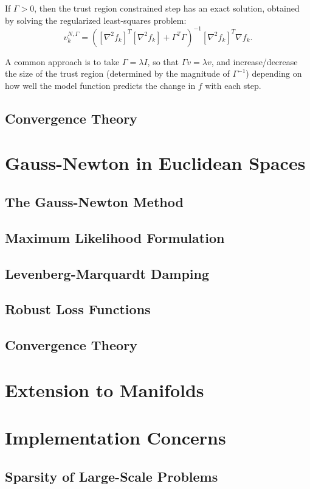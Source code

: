 \documentclass[reqno]{amsart}
\numberwithin{equation}{section}
\begin{document}
If $\Gamma > 0$, then the trust region constrained step has an exact solution, obtained
by solving the regularized least-squares problem:
$$
    v^{N,\Gamma}_k = \left([\nabla^2 f_k]^T [\nabla^2 f_k] + \Gamma^T \Gamma\right)^{-1}
        [\nabla^2 f_k]^T \nabla f_k.
$$

A common approach is to take $\Gamma = \lambda I$, so that $\Gamma v = \lambda v$,
and increase/decrease the size of the trust region (determined by the magnitude
of $\Gamma^{-1}$) depending on how well the model function predicts the change in
$f$ with each step.

\subsection{Convergence Theory}

\section{Gauss-Newton in Euclidean Spaces}
\subsection{The Gauss-Newton Method}
\subsection{Maximum Likelihood Formulation}
\subsection{Levenberg-Marquardt Damping}
\subsection{Robust Loss Functions}
\subsection{Convergence Theory}

\section{Extension to Manifolds}

\section{Implementation Concerns}
\subsection{Sparsity of Large-Scale Problems}
\end{document}
